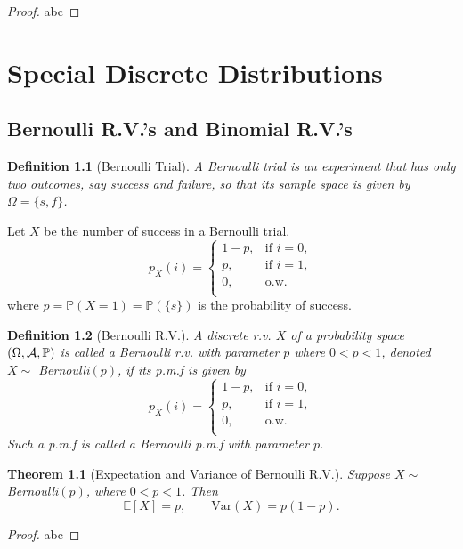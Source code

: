 \documentclass[openany,12pt]{book}
\newtheorem{theorem}{Theorem}[chapter]
\newtheorem{definition}{Definition}[chapter]
\begin{document}
\begin{proof}
  abc
\end{proof}

\chapter{Special Discrete Distributions}
\section{Bernoulli R.V.'s and Binomial R.V.'s}

\begin{definition}[Bernoulli Trial]
  A Bernoulli trial is an experiment that has only two outcomes, say success and failure, so that its sample space is given by $\Omega=\{s,f\}$.
\end{definition}

Let $X$ be the number of success in a Bernoulli trial.
$$
  p_X(i)=
  \begin{cases}
    1-p, &\text{if } i=0, \\
    p, &\text{if }i=1,    \\
    0, &\text{o.w.}      \\
  \end{cases}
$$
where $p=\mathbb{P}(X=1)=\mathbb{P}(\{s\})$ is the probability of success.

\begin{definition}[Bernoulli R.V.]
  A discrete r.v. $X$ of a probability space $(\Omega,\mathcal{A},\mathbb{P})$ is called a Bernoulli r.v. with parameter $p$ where $0<p<1$, denoted $X\sim$ Bernoulli$(p)$, if its p.m.f is given by
  $$
    p_X(i)=
    \begin{cases}
      1-p, &\text{if } i=0, \\
      p, &\text{if } i=1,    \\
      0, &\text{o.w.}      \\
    \end{cases}
  $$
  Such a p.m.f is called a Bernoulli p.m.f with parameter $p$.
\end{definition}

\begin{theorem}[Expectation and Variance of Bernoulli R.V.]
  Suppose $X\sim$ Bernoulli$(p)$, where $0<p<1$. Then $$\mathbb{E}[X]=p,\qquad \mathrm{Var}(X)=p(1-p).$$
\end{theorem}

\begin{proof}
  abc
\end{proof}
\end{document}

